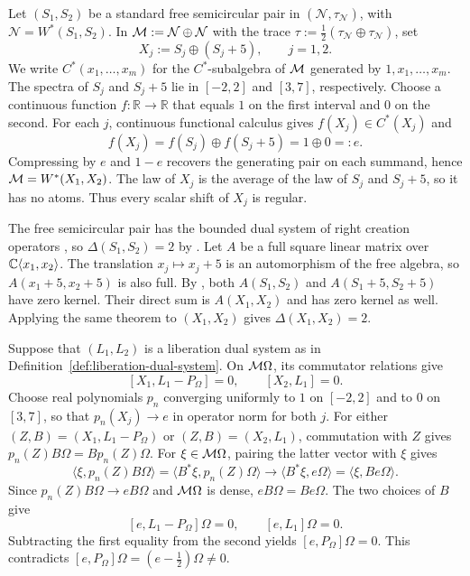 \begin{example}\label{ex:maximal-delta-without-liberation}
Let $(S_1,S_2)$ be a standard free semicircular pair in $(\mathcal N,\tau_{\mathcal N})$, with $\mathcal N=W^*(S_1,S_2)$.
In $\mathcal M:=\mathcal N\oplus\mathcal N$ with the trace $\tau:=\tfrac12(\tau_{\mathcal N}\oplus\tau_{\mathcal N})$, set
\[
 X_j:=S_j\oplus(S_j+5),\qquad j=1,2.
\]
We write $C^*(x_1,\ldots,x_m)$ for the $C^*$-subalgebra of $\mathcal M$ generated by $1,x_1,\ldots,x_m$.
The spectra of $S_j$ and $S_j+5$ lie in $[-2,2]$ and $[3,7]$, respectively.
Choose a continuous function $f:\mathbb R\to\mathbb R$ that equals $1$ on the first interval and $0$ on the second.
For each $j$, continuous functional calculus gives $f(X_j)\in C^*(X_j)$ and
\[
 f(X_j)=f(S_j)\oplus f(S_j+5)=1\oplus0=:e.
\]
Compressing by $e$ and $1-e$ recovers the generating pair on each summand, hence $\mathcal M=W^*(X_1,X_2)$.
The law of $X_j$ is the average of the law of $S_j$ and $S_j+5$, so it has no atoms.
Thus every scalar shift of $X_j$ is regular.

The free semicircular pair has the bounded dual system of right creation operators \cite[5.13]{Voi98}, so $\Delta(S_1,S_2)=2$ by \cite[Proposition~6.2]{MSY23}.
Let $A$ be a full square linear matrix over $\mathbb C\langle x_1,x_2\rangle$.
The translation $x_j\mapsto x_j+5$ is an automorphism of the free algebra, so $A(x_1+5,x_2+5)$ is also full.
By \cite[Theorem~3.1]{MSY23}, both $A(S_1,S_2)$ and $A(S_1+5,S_2+5)$ have zero kernel.
Their direct sum is $A(X_1,X_2)$ and has zero kernel as well.
Applying the same theorem to $(X_1,X_2)$ gives $\Delta(X_1,X_2)=2$.

Suppose that $(L_1,L_2)$ is a liberation dual system as in Definition~\ref{def:liberation-dual-system}.
On $\mathcal M\Omega$, its commutator relations give
\[
 [X_1,L_1-P_\Omega]=0,\qquad [X_2,L_1]=0.
\]
Choose real polynomials $p_n$ converging uniformly to $1$ on $[-2,2]$ and to $0$ on $[3,7]$, so that $p_n(X_j)\rightarrow e$ in operator norm for both $j$.
For either $(Z,B)=(X_1,L_1-P_\Omega)$ or $(Z,B)=(X_2,L_1)$, commutation with $Z$ gives $p_n(Z)B\Omega=Bp_n(Z)\Omega$.
For $\xi\in\mathcal M\Omega$, pairing the latter vector with $\xi$ gives
\[
 \langle \xi,p_n(Z)B\Omega\rangle
 =\langle B^*\xi,p_n(Z)\Omega\rangle
 \longrightarrow\langle B^*\xi,e\Omega\rangle
 =\langle \xi,Be\Omega\rangle .
\]
Since $p_n(Z)B\Omega\rightarrow eB\Omega$ and $\mathcal M\Omega$ is dense, $eB\Omega=Be\Omega$.
The two choices of $B$ give
\[
 [e,L_1-P_\Omega]\Omega=0,\qquad [e,L_1]\Omega=0.
\]
Subtracting the first equality from the second yields $[e,P_\Omega]\Omega=0$.
This contradicts $[e,P_\Omega]\Omega=(e-\tfrac12)\Omega\ne0$.
\end{example}

